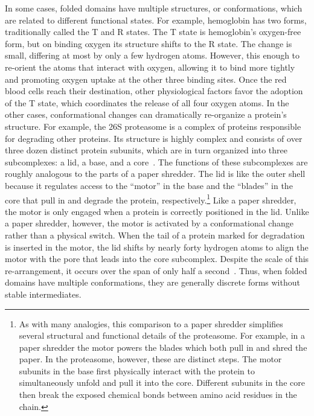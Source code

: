 In some cases, folded domains have multiple structures, or conformations, which are related to different functional states. For example, hemoglobin has two forms, traditionally called the T and R states. The T state is hemoglobin's oxygen-free form, but on binding oxygen its structure shifts to the R state. The change is small, differing at most by only a few hydrogen atoms. However, this enough to re-orient the atoms that interact with oxygen, allowing it to bind more tightly and promoting oxygen uptake at the other three binding sites. Once the red blood cells reach their destination, other physiological factors favor the adoption of the T state, which coordinates the release of all four oxygen atoms. In the other cases, conformational changes can dramatically re-organize a protein's structure. For example, the 26S proteasome is a complex of proteins responsible for degrading other proteins. Its structure is highly complex and consists of over three dozen distinct protein subunits, which are in turn organized into three subcomplexes: a lid, a base, and a core~\cite{Finley2016, Bard2018}. The functions of these subcomplexes are roughly analogous to the parts of a paper shredder. The lid is like the outer shell because it regulates access to the ``motor'' in the base and the ``blades'' in the core that pull in and degrade the protein, respectively.\footnote{As with many analogies, this comparison to a paper shredder simplifies several structural and functional details of the proteasome. For example, in a paper shredder the motor powers the blades which both pull in and shred the paper. In the proteasome, however, these are distinct steps. The motor subunits in the base first physically interact with the protein to simultaneously unfold and pull it into the core. Different subunits in the core then break the exposed chemical bonds between amino acid residues in the chain.} Like a paper shredder, the motor is only engaged when a protein is correctly positioned in the lid. Unlike a paper shredder, however, the motor is activated by a conformational change rather than a physical switch. When the tail of a protein marked for degradation is inserted in the motor, the lid shifts by nearly forty hydrogen atoms to align the motor with the pore that leads into the core subcomplex. Despite the scale of this re-arrangement, it occurs over the span of only half a second~\cite{Bard2019}. Thus, when folded domains have multiple conformations, they are generally discrete forms without stable intermediates.

